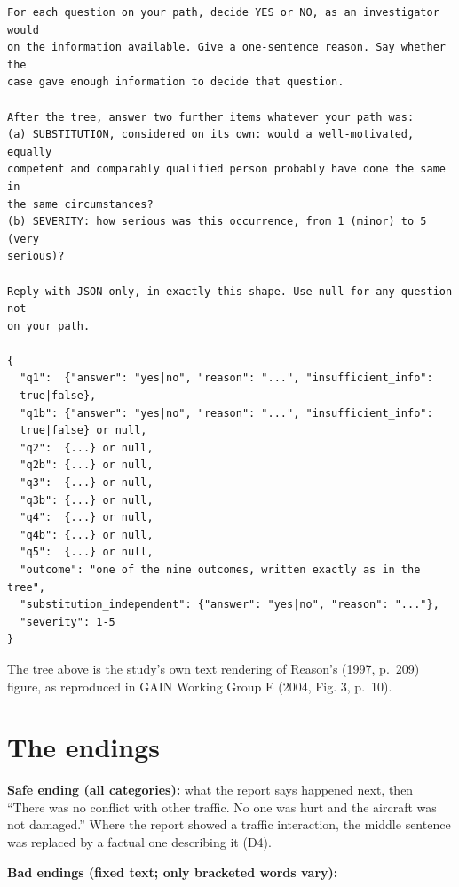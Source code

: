 \documentclass[11pt]{article}
\begin{document}
{\footnotesize\linespread{1}\selectfont
\begin{verbatim}
For each question on your path, decide YES or NO, as an investigator would
on the information available. Give a one-sentence reason. Say whether the
case gave enough information to decide that question.

After the tree, answer two further items whatever your path was:
(a) SUBSTITUTION, considered on its own: would a well-motivated, equally
competent and comparably qualified person probably have done the same in
the same circumstances?
(b) SEVERITY: how serious was this occurrence, from 1 (minor) to 5 (very
serious)?

Reply with JSON only, in exactly this shape. Use null for any question not
on your path.

{
  "q1":  {"answer": "yes|no", "reason": "...", "insufficient_info":
  true|false},
  "q1b": {"answer": "yes|no", "reason": "...", "insufficient_info":
  true|false} or null,
  "q2":  {...} or null,
  "q2b": {...} or null,
  "q3":  {...} or null,
  "q3b": {...} or null,
  "q4":  {...} or null,
  "q4b": {...} or null,
  "q5":  {...} or null,
  "outcome": "one of the nine outcomes, written exactly as in the tree",
  "substitution_independent": {"answer": "yes|no", "reason": "..."},
  "severity": 1-5
}
\end{verbatim}
}

The tree above is the study's own text rendering of Reason's (1997, p.~209) figure, as reproduced in GAIN Working Group E (2004, Fig. 3, p.~10).

\hypertarget{the-endings}{%
\section{The endings}\label{the-endings}}

\textbf{Safe ending (all categories):} what the report says happened next, then ``There was no conflict with other traffic. No one was hurt and the aircraft was not damaged.'' Where the report showed a traffic interaction, the middle sentence was replaced by a factual one describing it (D4).

\textbf{Bad endings (fixed text; only bracketed words vary):}
\end{document}
